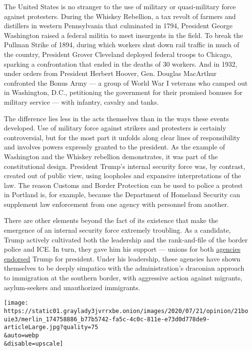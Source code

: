 The United States is no stranger to the use of military or
quasi-military force against protesters. During the Whiskey Rebellion, a
tax revolt of farmers and distillers in western Pennsylvania that
culminated in 1794, President George Washington raised a federal militia
to meet insurgents in the field. To break the Pullman Strike of 1894,
during which workers shut down rail traffic in much of the country,
President Grover Cleveland deployed federal troops to Chicago, sparking
a confrontation that ended in the deaths of 30 workers. And in 1932,
under orders from President Herbert Hoover, Gen. Douglas MacArthur
confronted the Bonus Army --- a group of World War I veterans who camped
out in Washington, D.C., petitioning the government for their promised
bonuses for military service --- with infantry, cavalry and tanks.

The difference lies less in the acts themselves than in the ways these
events developed. Use of military force against strikers and protesters
is certainly controversial, but for the most part it unfolds along clear
lines of responsibility and involves powers expressly granted to the
president. As the example of Washington and the Whiskey rebellion
demonstrates, it was part of the constitutional design. President
Trump's internal security force was, by contrast, created out of public
view, using loopholes and expansive interpretations of the law. The
reason Customs and Border Protection can be used to police a protest in
Portland is, for example, because the Department of Homeland Security
can supplement law enforcement from one agency with personnel from
another.

There are other elements beyond the fact of its existence that make the
emergence of an internal security force extremely troubling. As a
candidate, Trump actively cultivated both the leadership and the
rank-and-file of the border police and ICE. In turn, they gave him his
support --- unions for both
\href{https://www.npr.org/2016/03/30/472420387/border-patrol-union-endorses-donald-trump}{agencies}
\href{https://www.politico.com/story/2016/09/immigration-customs-enforcement-union-endorses-trump-228664}{endorsed}
Trump for president. Under his leadership, these agencies have shown
themselves to be deeply simpatico with the administration's draconian
approach to immigration at the southern border, with aggressive action
against migrants, asylum-seekers and unauthorized immigrants.

\texttt{[image: https://static01.graylady3jvrrxbe.onion/images/2020/07/21/opinion/21bouie3/merlin\_174758886\_b77b5742-fa5c-4c0c-811e-e73d0d778de9-articleLarge.jpg?quality=75\\\&auto=webp\\\&disable=upscale]}

